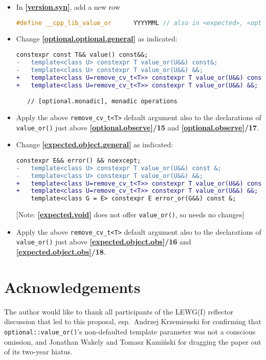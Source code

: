 \documentclass[11pt]{article}
\newcommand{\wgpaper}[1]{\href{https://wg21.link/#1}{#1}}
\newcommand{\isref}[1]{\textbf{[\wgpaper{#1}]}}
\newcommand{\isnref}[2]{\textbf{[\href{https://wg21.link/#1\##2}{#1}]/#2}}
\begin{document}
\begin{itemize}
\item In \isref{version.syn}, add a new row
  \begin{lstlisting}[language=c++]
    #define __cpp_lib_value_or      YYYYMML // also in <expected>, <optional>
  \end{lstlisting}
\item Change \isref{optional.optional.general} as indicated:
  \begin{lstlisting}[language=diff]
    constexpr const T&& value() const&&;
-   template<class U> constexpr T value_or(U&&) const&;
-   template<class U> constexpr T value_or(U&&) &&;
+   template<class U=remove_cv_t<T>> constexpr T value_or(U&&) const&;
+   template<class U=remove_cv_t<T>> constexpr T value_or(U&&) &&;

   // [optional.monadic], monadic operations
  \end{lstlisting}
\item Apply the above \texttt{remove\_cv\_t<T>} default argument also
  to the declarations of \texttt{value\_or()} just above
  \isnref{optional.observe}{15} and \isnref{optional.observe}{17}.
\item Change \isref{expected.object.general} as indicated:
  \begin{lstlisting}[language=diff]
    constexpr E&& error() && noexcept;
-   template<class U> constexpr T value_or(U&&) const &;
-   template<class U> constexpr T value_or(U&&) &&;
+   template<class U=remove_cv_t<T>> constexpr T value_or(U&&) const &;
+   template<class U=remove_cv_t<T>> constexpr T value_or(U&&) &&;
    template<class G = E> constexpr E error_or(G&&) const &;
  \end{lstlisting}
  [Note: \isref{expected.void} does not offer \texttt{value\_or()}, so
    needs no changes]
\item Apply the above \texttt{remove\_cv\_t<T>} default argument also
  to the declarations of \texttt{value\_or()} just above
  \isnref{expected.object.obs}{16} and \isnref{expected.object.obs}{18}.
\end{itemize}

\section{Acknowledgements}

The author would like to thank all participants of the LEWG(I)
reflector discussion that led to this proposal, esp.\ Andrzej
Krzemienski for confirming that \texttt{optional::value\_or()}'s
non-defaulted template parameter was not a conscious omission, and
Jonathan Wakely and Tomasz Kamiński for dragging the paper out of its
two-year hiatus.
\end{document}

